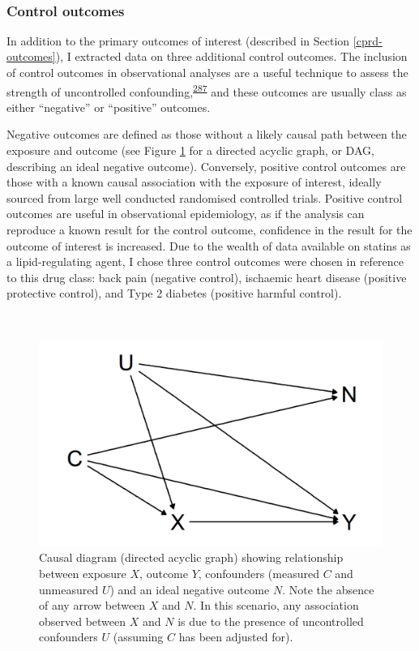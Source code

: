 \documentclass[a4paper, twoside]{templates/ociamthesis}
\begin{document}
~

\hypertarget{control-outcomes}{%
\subsubsection{Control outcomes}\label{control-outcomes}}

In addition to the primary outcomes of interest (described in Section \ref{cprd-outcomes}), I extracted data on three additional control outcomes. The inclusion of control outcomes in observational analyses are a useful technique to assess the strength of uncontrolled confounding,\textsuperscript{\protect\hyperlink{ref-lipsitch2010}{287}} and these outcomes are usually class as either ``negative'' or ``positive'' outcomes.

Negative outcomes are defined as those without a likely causal path between the exposure and outcome (see Figure \ref{fig:negativeOutcome} for a directed acyclic graph, or DAG, describing an ideal negative outcome). Conversely, positive control outcomes are those with a known causal association with the exposure of interest, ideally sourced from large well conducted randomised controlled trials. Positive control outcomes are useful in observational epidemiology, as if the analysis can reproduce a known result for the control outcome, confidence in the result for the outcome of interest is increased. Due to the wealth of data available on statins as a lipid-regulating agent, I chose three control outcomes were chosen in reference to this drug class: back pain (negative control), ischaemic heart disease (positive protective control), and Type 2 diabetes (positive harmful control).

~\\




\begin{figure}[H]

{\centering \includegraphics[width=0.8\linewidth]{figures/cprd-analysis/negativeOutcome} 

}

\caption[Causal diagram for ideal negative outcome]{Causal diagram (directed acyclic graph) showing relationship between exposure \(X\), outcome \(Y\), confounders (measured \(C\) and unmeasured \(U\)) and an ideal negative outcome \(N\). Note the absence of any arrow between \(X\) and \(N\). In this scenario, any association observed between \(X\) and \(N\) is due to the presence of uncontrolled confounders \(U\) (assuming \(C\) has been adjusted for).}\label{fig:negativeOutcome}
\end{figure}
\end{document}
